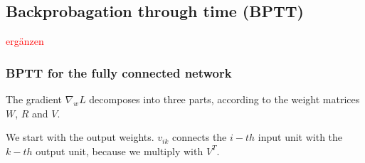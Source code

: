 \documentclass[10pt,a4paper]{article}
\begin{document}
\subsection{Backprobagation through time (BPTT)}
\textcolor{red}{ergänzen}

\subsubsection{BPTT for the fully connected network}
The gradient $\nabla_w L$ decomposes into three parts, according to the weight matrices $W$, $R$ and $V$.

We start with the output weights. $v_{ik}$ connects the $i-th$ input unit with the $k-th$ output unit, because we multiply with $V^T$.
\end{document}
